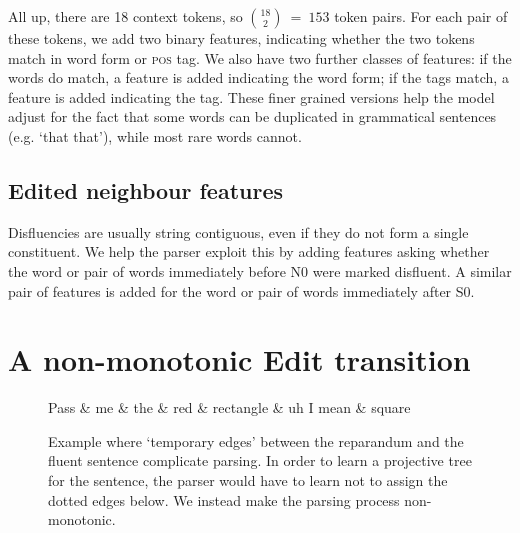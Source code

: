 \documentclass[11pt,letterpaper]{article}
\newcommand{\pos}{\textsc{pos}\xspace}
\newcommand{\szero}{S0\xspace}
\newcommand{\nzero}{N0\xspace}
\begin{document}
All up, there are 18 context tokens, so ${18 \choose 2}~=~153$ token pairs.
For each pair of these tokens, we add two binary features, indicating whether the
two tokens match in word form or \pos tag.  We also have two further classes of
features: if the words do match, a feature is added indicating the word form;
if the tags match, a feature is added indicating the tag. These finer grained
versions help the model adjust for the fact that some words can be duplicated
in grammatical sentences (e.g. `that that'), while most rare words cannot.

\subsection{Edited neighbour features}

Disfluencies are usually
string contiguous, even if they do not form a single constituent.  We help the
parser exploit this by adding features asking whether the word or pair of words
immediately before \nzero were marked disfluent. A similar pair of features is
added for the word or pair of words immediately after \szero.

\section{A non-monotonic Edit transition}
\label{sec:edittrans}
\begin{figure}
    \small
\begin{dependency}[theme=simple, segmented edge]
    \begin{deptext}[column sep=.075cm, row sep=.1ex]
    Pass \& me \& the \& red \& rectangle \& uh I mean \& square \\
    \end{deptext}
    \end{dependency}
    \caption{\small Example where `temporary edges' between the reparandum and the
    fluent sentence complicate parsing. In order to learn a projective tree
    for the sentence, the parser would have to learn not to assign the dotted
    edges below. We instead make the parsing process non-monotonic.
\label{fig:rectangle}}
\end{figure}
\end{document}
